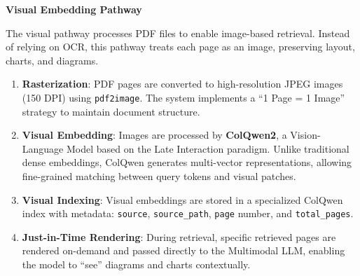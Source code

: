\begin{table}[H]
\centering
\caption{Text embedding and indexing pipeline stages.}
\label{tab:text_indexing}
\end{table}

\textbf{Visual Embedding Pathway}

The visual pathway processes PDF files to enable image-based retrieval. Instead of relying on OCR, this pathway treats each page as an image, preserving layout, charts, and diagrams.

\begin{enumerate}
    \item \textbf{Rasterization}: PDF pages are converted to high-resolution JPEG images (150 DPI) using \texttt{pdf2image}. The system implements a ``1 Page = 1 Image'' strategy to maintain document structure.
    
    \item \textbf{Visual Embedding}: Images are processed by \textbf{ColQwen2}, a Vision-Language Model based on the Late Interaction paradigm. Unlike traditional dense embeddings, ColQwen generates multi-vector representations, allowing fine-grained matching between query tokens and visual patches.
    
    \item \textbf{Visual Indexing}: Visual embeddings are stored in a specialized ColQwen index with metadata: \texttt{source}, \texttt{source\_path}, \texttt{page} number, and \texttt{total\_pages}.
    
    \item \textbf{Just-in-Time Rendering}: During retrieval, specific retrieved pages are rendered on-demand and passed directly to the Multimodal LLM, enabling the model to ``see'' diagrams and charts contextually.
\end{enumerate}

